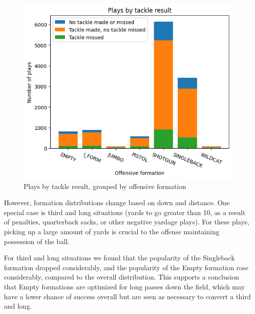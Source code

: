 \documentclass[bibtex, sigconf, hyperref={colorlinks=true,linkcolor=blue,urlcolor=blue}]{acmart}
\begin{document}
\begin{figure}[h]
  \centering
  \includegraphics[width=\linewidth]{plays-by-tackle-result.png}
  \caption{Plays by tackle result, grouped by offensive formation}
\end{figure}

However, formation distributions change based on down and distance. One special
case is third and long situations (yards to go greater than 10, as a result of
penalties, quarterback sacks, or other negative yardage plays). For these plays,
picking up a large amount of yards is crucial to the offense maintaining
possession of the ball.

For third and long situations we found that the popularity of the Singleback
formation dropped considerably, and the popularity of the Empty formation rose
considerably, compared to the overall distribution. This supports a conclusion
that Empty formations are optimized for long passes down the field, which may
have a lower chance of success overall but are seen as necessary to convert a
third and long.
\end{document}
